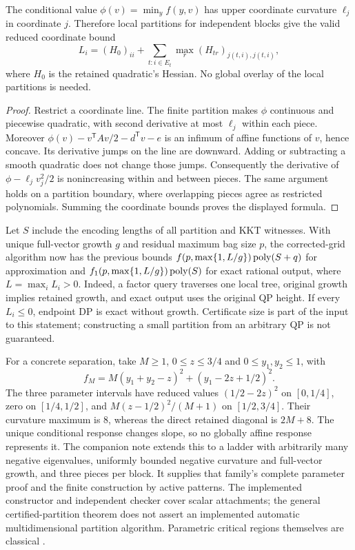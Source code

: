 \begin{proposition}
\label{prop:piecewisecurvature}
The conditional value $\phi(v)=\min_y f(y,v)$ has upper coordinate
curvature $\ell_j$ in coordinate $j$. Therefore local partitions for
independent blocks give the valid reduced coordinate bound
\[
L_i=(H_0)_{ii}+\sum_{t:i\in E_t}\max_r(H_{tr})_{j(t,i),j(t,i)},
\]
where $H_0$ is the retained quadratic's Hessian. No global overlay of
the local partitions is needed.
\end{proposition}
\begin{proof}
Restrict a coordinate line. The finite partition makes $\phi$ continuous
and piecewise quadratic, with second derivative at most $\ell_j$ within
each piece. Moreover $\phi(v)-v^{\mathsf T}Av/2-d^{\mathsf T}v-e$
is an infimum of affine functions of $v$, hence concave. Its derivative
jumps on the line are downward. Adding or subtracting a smooth quadratic
does not change those jumps. Consequently the derivative of
$\phi-\ell_jv_j^2/2$ is nonincreasing within and between pieces.
The same argument holds on a partition boundary, where overlapping
pieces agree as restricted polynomials. Summing the coordinate bounds
proves the displayed formula.
\end{proof}

Let $S$ include the encoding lengths of all partition and KKT witnesses.
With unique full-vector growth $g$ and residual maximum bag size $p$,
the corrected-grid algorithm now has the previous bounds
$f(p,\max\{1,L/g\})\operatorname{poly}(S+q)$ for approximation and
$f_1(p,\max\{1,L/g\})\operatorname{poly}(S)$ for exact rational output, where
$L=\max_i L_i>0$. Indeed, a factor query traverses one local tree,
original growth implies retained growth, and exact output uses the
original QP height. If every $L_i\le0$, endpoint DP is exact without
growth. Certificate size is part of the input to this statement;
constructing a small partition from an arbitrary QP is not guaranteed.

For a concrete separation, take $M\ge1$, $0\le z\le3/4$ and
$0\le y_1,y_2\le1$, with
\[
f_M=M(y_1+y_2-z)^2+(y_1-2z+1/2)^2.
\]
The three parameter intervals have reduced values
$(1/2-2z)^2$ on $[0,1/4]$, zero on $[1/4,1/2]$, and
$M(z-1/2)^2/(M+1)$ on $[1/2,3/4]$. Their curvature maximum is $8$,
whereas the direct retained diagonal is $2M+8$. The unique conditional
response changes slope, so no globally affine response represents it.
The companion note extends this to a ladder with arbitrarily many
negative eigenvalues, uniformly bounded negative curvature and full-vector
growth, and three pieces per block. It supplies that family's complete
parameter proof and the finite construction by active patterns. The
implemented constructor and independent checker cover scalar attachments;
the general certified-partition theorem does not assert an implemented
automatic multidimensional partition algorithm. Parametric critical
regions themselves are classical \cite{BemporadEtAl2002}.

